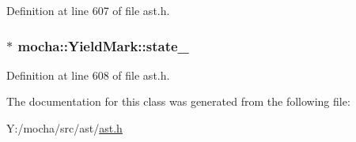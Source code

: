 Definition at line 607 of file ast.h.

\hypertarget{classmocha_1_1_yield_mark_a41c9796ef1dfbf005cd58a2a5a05a747}{
\subsubsection[{state\_\-}]{$\ast$ {\bf mocha::YieldMark::state\_\-}}}
\label{classmocha_1_1_yield_mark_a41c9796ef1dfbf005cd58a2a5a05a747}


Definition at line 608 of file ast.h.



The documentation for this class was generated from the following file:\begin{DoxyCompactItemize}
\item 
Y:/mocha/src/ast/\hyperlink{ast_8h}{ast.h}\end{DoxyCompactItemize}
